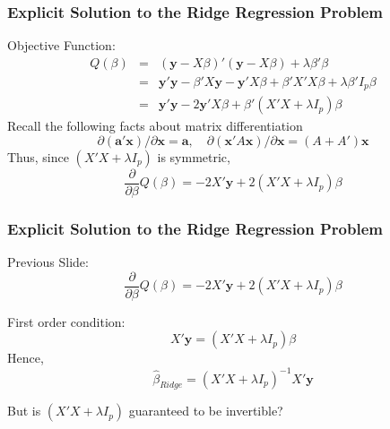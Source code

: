 \begin{frame}
  \frametitle{Explicit Solution to the Ridge Regression Problem}

  \small
Objective Function:
\begin{eqnarray*}
	Q(\beta)&=& (\mathbf{y} - X\beta)' (\mathbf{y} - X\beta) + \lambda \beta'\beta\\
	&=&\mathbf{y}'\mathbf{y} - \beta'X \mathbf{y} - \mathbf{y}'X\beta + \beta'X'X \beta + \lambda \beta' I_p \beta\\
	&=& \mathbf{y}'\mathbf{y} - 2 \mathbf{y}'X\beta + \beta'(X'X + \lambda I_p)\beta
\end{eqnarray*}
Recall the following facts about matrix differentiation
		\[\partial (\mathbf{a}' \mathbf{x})/\partial \mathbf{x}  = \mathbf{a}, \quad
		\partial( \mathbf{x}'A \mathbf{x})/\partial \mathbf{x} = (A + A')\mathbf{x}
  \]
Thus, since $(X'X + \lambda I_p)$ is symmetric,
$$\frac{\partial}{\partial \beta} Q(\beta) = -2X'\mathbf{y} + 2(X'X + \lambda I_p)\beta$$
\end{frame}
\begin{frame}
  \frametitle{Explicit Solution to the Ridge Regression Problem}

  Previous Slide:
$$\frac{\partial}{\partial \beta} Q(\beta) = -2X'\mathbf{y} + 2(X'X + \lambda I_p)\beta$$

First order condition:
	$$X'\textbf{y} = (X'X + \lambda I_p)\beta$$
Hence,
	$$\widehat{\beta}_{Ridge} = (X'X + \lambda I_p)^{-1} X'\textbf{y}$$

  \vspace{1em}

  \alert{But is $(X'X + \lambda I_p)$ guaranteed to be invertible?} 
\end{frame}
